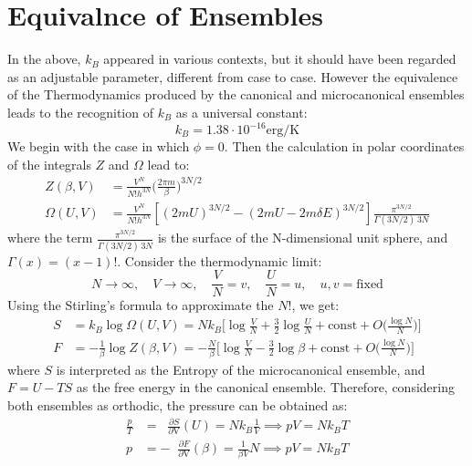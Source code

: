 \documentclass{article}
\newcommand*\derV[1]{\mathop{}\!\frac{\partial #1}{\partial \mathrm{V}} }
\begin{document}
\section{Equivalnce of Ensembles}
In the above, $k_B$ appeared in various contexts, but it should have been regarded as an adjustable parameter, different from case to case. However the equivalence of the Thermodynamics produced by the canonical and microcanonical ensembles leads to the recognition of $k_B$ as a universal constant:
$$k_B = 1.38 \cdot 10^{-16} \mathrm{erg/K}$$
We begin with the case in which $\phi = 0$. Then the calculation in polar coordinates of the integrals $Z$ and $\Omega$ lead to:
\begin{equation}
    \begin{aligned}
    Z(\beta,V) &= \frac{V^N}{N!h^{3N}} \bigl( \frac{2\pi m}{\beta}  \bigr)^{3N/2}\\
    \Omega(U,V) &= \frac{V^N}{N! h^{3N}}[(2mU)^{3N/2} - (2mU -2m\delta E)^{3N/2}] \frac{\pi^{3N/2}}{\Gamma(3N/2) \, 3N}
    \end{aligned}
\end{equation}
where the term $\frac{\pi^{3N/2}}{\Gamma(3N/2) \, 3N}$ is the surface of the N-dimensional unit sphere, and $\Gamma(x) = (x-1)!$. Consider the thermodynamic limit:
$$ N\xrightarrow{} \infty, \quad V \xrightarrow{} \infty, \quad \frac{V}{N} = v, \quad \frac{U}{N} = u,\quad u,v=\mathrm{fixed} $$
Using the Stirling's formula to approximate the $N!$, we get:
\begin{equation}
    \begin{aligned}
    S &= k_B \log \Omega(U,V) = N k_B \bigl[  \log \frac{V}{N} + \frac{3}{2} \log \frac{U}{N} + \mathrm{const} + O\bigl( \frac{\log N }{N}\bigr)\bigr]\\
     F&= -  \frac{1}{\beta} \log Z(\beta,V) = -\frac{N}{\beta} \bigl[  \log \frac{V}{N} -\frac{3}{2} \log \beta + \mathrm{const}+  O\bigl( \frac{\log N }{N}\bigr) \bigr]
    \end{aligned}
\end{equation}
where $S$ is interpreted as the Entropy of the microcanonical ensemble, and $F= U - TS$ as the free energy in the canonical ensemble. Therefore, considering both ensembles as orthodic, the pressure can be obtained as:
\begin{equation*}
    \begin{aligned}
    \frac{p}{T} &= \derV{S} (U) = N k_B \frac{1}{V} \implies pV = N k_B T \\
    p &= - \derV{F}(\beta) = \frac{1}{\beta V} N \implies p V = N k_B T
    \end{aligned}
\end{equation*}
\end{document}
